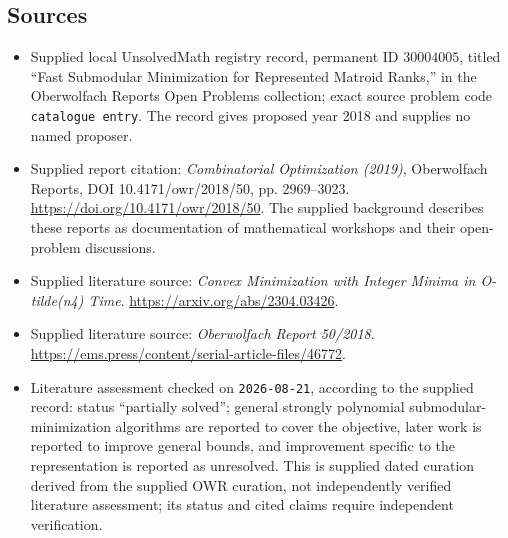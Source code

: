 \documentclass[11pt]{article}
\begin{document}
\subsection{Sources}
\begin{itemize}
\item Supplied local UnsolvedMath registry record, permanent ID \(30004005\), titled ``Fast Submodular Minimization for Represented Matroid Ranks,'' in the Oberwolfach Reports Open Problems collection; exact source problem code \texttt{catalogue entry}. The record gives proposed year 2018 and supplies no named proposer.
\item Supplied report citation: \emph{Combinatorial Optimization (2019)}, Oberwolfach Reports, DOI 10.4171/owr/2018/50, pp. 2969--3023. \url{https://doi.org/10.4171/owr/2018/50}. The supplied background describes these reports as documentation of mathematical workshops and their open-problem discussions.
\item Supplied literature source: \emph{Convex Minimization with Integer Minima in O-tilde(n4) Time}. \url{https://arxiv.org/abs/2304.03426}.
\item Supplied literature source: \emph{Oberwolfach Report 50/2018}. \url{https://ems.press/content/serial-article-files/46772}.
\item Literature assessment checked on \texttt{2026-08-21}, according to the supplied record: status ``partially solved''; general strongly polynomial submodular-minimization algorithms are reported to cover the objective, later work is reported to improve general bounds, and improvement specific to the representation is reported as unresolved. This is supplied dated curation derived from the supplied OWR curation, not independently verified literature assessment; its status and cited claims require independent verification.
\end{itemize}
\end{document}
